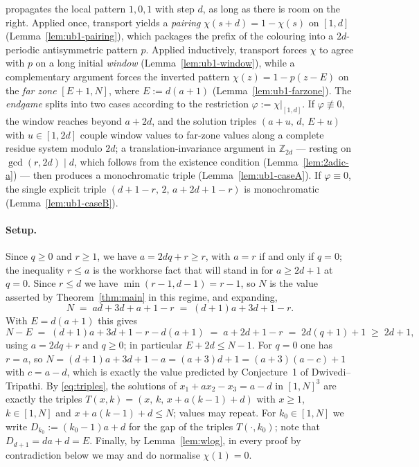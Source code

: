 propagates the local pattern $1,0,1$ with step $d$, as long as there is room
on the right. Applied once, transport yields a \emph{pairing}
$\chi(s+d) = 1 - \chi(s)$ on $[1,d]$ (Lemma~\ref{lem:ub1-pairing}), which
packages the prefix of the colouring into a $2d$-periodic antisymmetric
pattern $p$. Applied inductively, transport forces $\chi$ to agree with $p$
on a long initial \emph{window} (Lemma~\ref{lem:ub1-window}), while a
complementary argument forces the inverted pattern
$\chi(z) = 1 - p(z-E)$ on the \emph{far zone} $[E+1, N]$, where
$E := d(a+1)$ (Lemma~\ref{lem:ub1-farzone}). The \emph{endgame} splits into
two cases according to the restriction $\varphi := \chi|_{[1,d]}$. If
$\varphi \not\equiv 0$, the window reaches beyond $a + 2d$, and the solution
triples $(a+u,\, d,\, E+u)$ with $u \in [1,2d]$ couple window values to
far-zone values along a complete residue system modulo $2d$; a
translation-invariance argument in $\mathbb{Z}_{2d}$ --- resting on
$\gcd(r,2d) \mid d$, which follows from the existence condition
(Lemma~\ref{lem:2adic-a}) --- then produces a monochromatic triple
(Lemma~\ref{lem:ub1-caseA}). If $\varphi \equiv 0$, the single explicit
triple $(d+1-r,\, 2,\, a+2d+1-r)$ is monochromatic
(Lemma~\ref{lem:ub1-caseB}).

\paragraph{Setup.}
Since $q \ge 0$ and $r \ge 1$, we have $a = 2dq + r \ge r$, with $a = r$ if
and only if $q = 0$; the inequality $r \le a$ is the workhorse fact that
will stand in for $a \ge 2d+1$ at $q = 0$. Since $r \le d$ we have
$\min(r-1, d-1) = r-1$, so $N$ is the value asserted by
Theorem~\ref{thm:main} in this regime, and expanding,
\[
N \;=\; ad + 3d + a + 1 - r \;=\; (d+1)a + 3d + 1 - r .
\]
With $E = d(a+1)$ this gives
\[
N - E \;=\; (d+1)a + 3d + 1 - r - d(a+1) \;=\; a + 2d + 1 - r
\;=\; 2d(q+1) + 1 \;\ge\; 2d + 1,
\]
using $a = 2dq + r$ and $q \ge 0$; in particular $E + 2d \le N - 1$. For
$q = 0$ one has $r = a$, so
$N = (d+1)a + 3d + 1 - a = (a+3)d + 1 = (a+3)(a-c) + 1$ with $c = a - d$,
which is exactly the value predicted by Conjecture~1 of Dwivedi--Tripathi.
By \eqref{eq:triples}, the solutions of
$x_1 + a x_2 - x_3 = a - d$ in $[1,N]^3$ are exactly the triples
$T(x,k) = (x,\, k,\, x + a(k-1) + d)$ with $x \ge 1$, $k \in [1,N]$ and
$x + a(k-1) + d \le N$; values may repeat. For $k_0 \in [1,N]$ we write
$D_{k_0} := (k_0 - 1)a + d$ for the gap of the triples $T(\cdot, k_0)$;
note that $D_{d+1} = da + d = E$. Finally, by Lemma~\ref{lem:wlog}, in every
proof by contradiction below we may and do normalise $\chi(1) = 0$.

